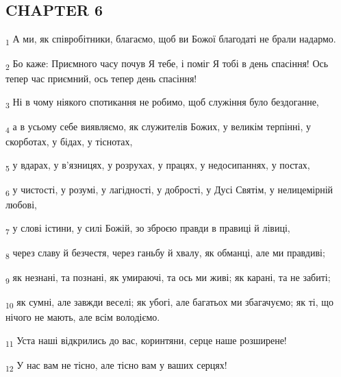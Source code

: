 \subsection{CHAPTER 6}
\begin{tcolorbox}
\textsubscript{1} А ми, як співробітники, благаємо, щоб ви Божої благодаті не брали надармо.
\end{tcolorbox}
\begin{tcolorbox}
\textsubscript{2} Бо каже: Приємного часу почув Я тебе, і поміг Я тобі в день спасіння! Ось тепер час приємний, ось тепер день спасіння!
\end{tcolorbox}
\begin{tcolorbox}
\textsubscript{3} Ні в чому ніякого спотикання не робимо, щоб служіння було бездоганне,
\end{tcolorbox}
\begin{tcolorbox}
\textsubscript{4} а в усьому себе виявляємо, як служителів Божих, у великім терпінні, у скорботах, у бідах, у тіснотах,
\end{tcolorbox}
\begin{tcolorbox}
\textsubscript{5} у вдарах, у в'язницях, у розрухах, у працях, у недосипаннях, у постах,
\end{tcolorbox}
\begin{tcolorbox}
\textsubscript{6} у чистості, у розумі, у лагідності, у добрості, у Дусі Святім, у нелицемірній любові,
\end{tcolorbox}
\begin{tcolorbox}
\textsubscript{7} у слові істини, у силі Божій, зо зброєю правди в правиці й лівиці,
\end{tcolorbox}
\begin{tcolorbox}
\textsubscript{8} через славу й безчестя, через ганьбу й хвалу, як обманці, але ми правдиві;
\end{tcolorbox}
\begin{tcolorbox}
\textsubscript{9} як незнані, та познані, як умираючі, та ось ми живі; як карані, та не забиті;
\end{tcolorbox}
\begin{tcolorbox}
\textsubscript{10} як сумні, але завжди веселі; як убогі, але багатьох ми збагачуємо; як ті, що нічого не мають, але всім володіємо.
\end{tcolorbox}
\begin{tcolorbox}
\textsubscript{11} Уста наші відкрились до вас, коринтяни, серце наше розширене!
\end{tcolorbox}
\begin{tcolorbox}
\textsubscript{12} У нас вам не тісно, але тісно вам у ваших серцях!
\end{tcolorbox}
